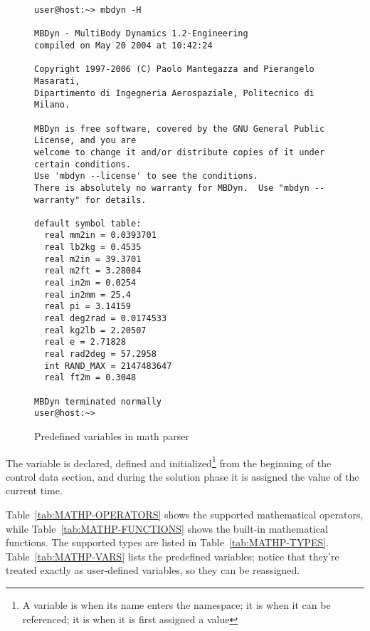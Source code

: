 \begin{figure}
\label{fig:MBDYN-H}
\centering
\small
\begin{minipage}{120mm}
\begin{verbatim}
user@host:~> mbdyn -H

MBDyn - MultiBody Dynamics 1.2-Engineering
compiled on May 20 2004 at 10:42:24

Copyright 1997-2006 (C) Paolo Mantegazza and Pierangelo Masarati,
Dipartimento di Ingegneria Aerospaziale, Politecnico di Milano.

MBDyn is free software, covered by the GNU General Public License, and you are
welcome to change it and/or distribute copies of it under certain conditions.
Use 'mbdyn --license' to see the conditions.
There is absolutely no warranty for MBDyn.  Use "mbdyn --warranty" for details.

default symbol table:
  real mm2in = 0.0393701
  real lb2kg = 0.4535
  real m2in = 39.3701
  real m2ft = 3.28084
  real in2m = 0.0254
  real in2mm = 25.4
  real pi = 3.14159
  real deg2rad = 0.0174533
  real kg2lb = 2.20507
  real e = 2.71828
  real rad2deg = 57.2958
  int RAND_MAX = 2147483647
  real ft2m = 0.3048

MBDyn terminated normally
user@host:~>
\end{verbatim}
\end{minipage}
\caption{Predefined variables in math parser}
\end{figure}

\noindent
The variable  is declared, defined and initialized\footnote{
    A variable is  when its name enters the namespace;
    it is  when it can be referenced;
    it is  when it is first assigned a value
} from the beginning of the control data section, and during the solution 
phase it is assigned the value of the current time. 

\noindent
Table~\ref{tab:MATHP-OPERATORS} shows the supported mathematical 
operators, while Table~\ref{tab:MATHP-FUNCTIONS} shows the built-in
mathematical functions.
The supported types are listed in Table~\ref{tab:MATHP-TYPES}.
Table~\ref{tab:MATHP-VARS} lists the predefined variables; notice
that they're treated exactly as user-defined variables, so they 
can be reassigned.

